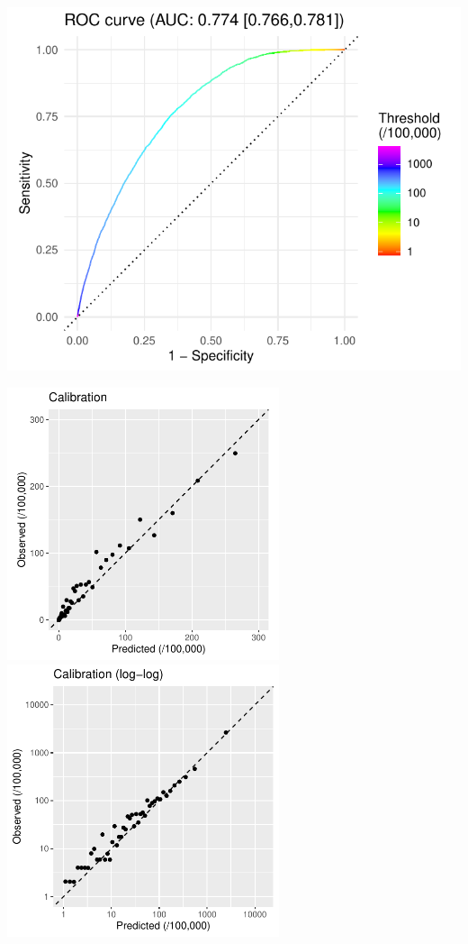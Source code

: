 \documentclass[12pt]{article}
\begin{document}
\begin{center}
\includegraphics[width=\textwidth]{figures/roc.pdf}
\end{center}


\begin{center}
\includegraphics[width=0.6\textwidth]{figures/calibration50_zoom.pdf}
\includegraphics[width=0.6\textwidth]{figures/calibration50_log.pdf}
\end{center}
\end{document}
